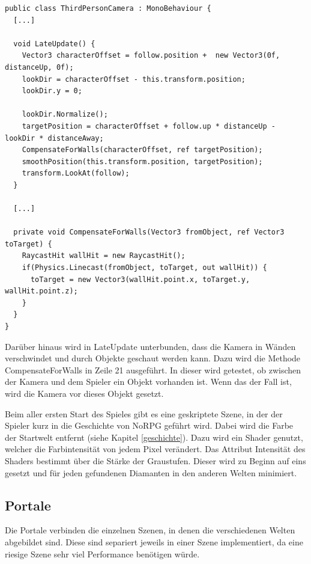 \begin{scriptsize}
\lstset{
	float,
	caption=Skript: ThirdPersonCamera.cs, 
	language=[Sharp]C, 
	frame=single,  
	showstringspaces=false, 
	showspaces=false, 
	numbers=left, 
	captionpos=b, 
	belowcaptionskip=4pt,
	basicstyle=\ttfamily
} 
\begin{lstlisting}[label=lst:lateupdate]
public class ThirdPersonCamera : MonoBehaviour {
  [...]
  
  void LateUpdate() {
    Vector3 characterOffset = follow.position +  new Vector3(0f, distanceUp, 0f);
    lookDir = characterOffset - this.transform.position;
    lookDir.y = 0;
    
    lookDir.Normalize();
    targetPosition = characterOffset + follow.up * distanceUp - lookDir * distanceAway;
    CompensateForWalls(characterOffset, ref targetPosition);
    smoothPosition(this.transform.position, targetPosition);
    transform.LookAt(follow);
  }

  [...]
  
  private void CompensateForWalls(Vector3 fromObject, ref Vector3 toTarget) {
    RaycastHit wallHit = new RaycastHit();
    if(Physics.Linecast(fromObject, toTarget, out wallHit)) {
      toTarget = new Vector3(wallHit.point.x, toTarget.y, wallHit.point.z);
    }
  }
}
\end{lstlisting}
\end{scriptsize}

			Darüber hinaus wird in LateUpdate unterbunden, dass die Kamera in Wänden verschwindet und durch Objekte geschaut werden kann. Dazu wird die Methode CompensateForWalls in Zeile 21 ausgeführt. In dieser wird getestet, ob zwischen der Kamera und dem Spieler ein Objekt vorhanden ist. Wenn das der Fall ist, wird die Kamera vor dieses Objekt gesetzt.

			Beim aller ersten Start des Spieles gibt es eine geskriptete Szene, in der der Spieler kurz in die Geschichte von NoRPG geführt wird. Dabei wird die Farbe der Startwelt entfernt (siehe Kapitel \ref{geschichte}). Dazu wird ein Shader genutzt, welcher die Farbintensität von jedem Pixel verändert. Das Attribut Intensität des Shaders bestimmt über die Stärke der Graustufen. Dieser wird zu Beginn auf eins gesetzt und für jeden gefundenen Diamanten in den anderen Welten minimiert.
    
		\subsection{Portale}
			Die Portale verbinden die einzelnen Szenen, in denen die verschiedenen Welten abgebildet sind. Diese sind separiert jeweils in einer Szene implementiert, da eine riesige Szene sehr viel Performance benötigen würde.
	
